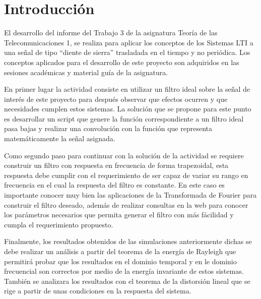 \section{Introducción}\label{intro}
El desarrollo del informe del Trabajo 3 de la asignatura Teoría de las Telecomunicaciones 1, se realiza para aplicar los conceptos de los Sistemas LTI a una señal de tipo ``diente de sierra'' trasladada en el tiempo y no periódica. Los conceptos aplicados para el desarrollo de este proyecto son adquiridos en las sesiones académicas y material guía de la asignatura.

En primer lugar la actividad consiste en utilizar un filtro ideal sobre la señal de interés de este proyecto para después observar que efectos ocurren y que necesidades cumplen estos sistemas. La solución que se propone para este punto es desarrollar un script que genere la función correspondiente a un filtro ideal pasa bajas y realizar una convolución con la función que representa matemáticamente la señal asignada.

Como segundo paso para continuar con la solución de la actividad se requiere construir un filtro con respuesta en frecuencia de forma trapezoidal, esta respuesta debe cumplir con el requerimiento de ser capaz de variar su rango en frecuencia en el cual la respuesta del filtro es constante. En este caso es importante conocer muy bien las aplicaciones de la Transformada de Fourier para construir el filtro deseado, además de realizar consultas en la web para conocer los parámetros necesarios que permita generar el filtro con más fácilidad y cumpla el requerimiento propuesto.

Finalmente, los resultados obtenidos de las simulaciones anteriormente dichas se debe realizar un análisis a partir del teorema de la energía de Rayleigh que permitirá probar que los resultados en el dominio temporal y en le dominio frecuencial son correctos por medio de la energía invariante de estos sistemas. También se analizara los resultados con el teorema de la distorsión lineal que se rige a partir de unas condiciones en la respuesta del sistema.
